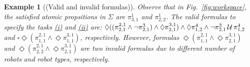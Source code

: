 \documentclass[Afour,sageh,times]{sagej}
\newtheorem{exmp}{Example}
\renewcommand{\ap}[3]{\mathcal{\pi}_{{#1},{#2}}^{#3}}
\newenvironment{cexmp}
{\addtocounter{exmp}{-1}\begin{exmp}}
  {\end{exmp}}
\begin{document}
 \begin{cexmp} [(Valid and invalid formulas)]
Observe that in Fig.~\ref{fig:workspace}, the satisfied atomic propsitions in $\Sigma$ are $\ap{3}{1}{1}$ and $\ap{2}{2}{1}$.   The valid formulas to specify the tasks \hyperref[task:i]{\it (i)} and \hyperref[task:ii]{\it (ii)} are: $\Diamond \Large((\ap{2}{1}{2,1}\wedge \neg \ap{2}{1}{3}) \wedge  \Diamond \ap{2}{1}{3,1}\Large)  \wedge \Diamond \ap{1}{2}{4} \wedge \neg \ap{2}{1}{3} \,\mathcal{U}\, \ap{1}{2}{4}$ and $\square \Diamond (\ap{1}{1}{2,1} \wedge \Diamond \ap{1}{1}{3,1})$, respectively. However, formulas $\Diamond (\ap{1}{1}{2,1} \wedge \Diamond \ap{2}{1}{3,1})$ and $\Diamond (\ap{2}{2}{2,1} \wedge \Diamond \ap{2}{1}{3,1})$ are two invalid formulas due to different number of robots and robot types, respectively.
 \end{cexmp}
\end{document}
